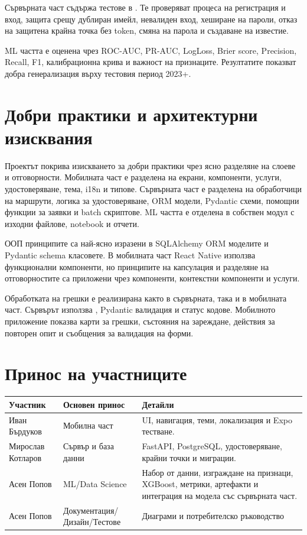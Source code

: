 \documentclass[12pt,a4paper]{article}
\newcommand{\code}[1]{\texttt{\detokenize{#1}}}
\begin{document}
Сървърната част съдържа тестове в \code{backend/tests/test_auth_api.py}. Те проверяват процеса на регистрация и вход, защита срещу дублиран имейл, невалиден вход, хеширане на пароли, отказ на защитена крайна точка без token, смяна на парола и създаване на известие.

ML частта е оценена чрез ROC-AUC, PR-AUC, LogLoss, Brier score, Precision, Recall, F1, калибрационна крива и важност на признаците. Резултатите показват добра генерализация върху тестовия период 2023+.

\section{Добри практики и архитектурни изисквания}

Проектът покрива изискването за добри практики чрез ясно разделяне на слоеве и отговорности. Мобилната част е разделена на екрани, компоненти, услуги, удостоверяване, тема, i18n и типове. Сървърната част е разделена на обработчици на маршрути, логика за удостоверяване, ORM модели, Pydantic схеми, помощни функции за заявки и batch скриптове. ML частта е отделена в собствен модул с изходни файлове, notebook и отчети.

ООП принципите са най-ясно изразени в SQLAlchemy ORM моделите и Pydantic schema класовете. В мобилната част React Native използва функционални компоненти, но принципите на капсулация и разделяне на отговорностите са приложени чрез компоненти, контекстни компоненти и услуги.

Обработката на грешки е реализирана както в сървърната, така и в мобилната част. Сървърът използва \code{HTTPException}, Pydantic валидация и статус кодове. Мобилното приложение показва карти за грешки, състояния на зареждане, действия за повторен опит и съобщения за валидация на форми.

\section{Принос на участниците}

\begin{longtable}{p{}p{}p{}}
\toprule
\textbf{Участник} & \textbf{Основен принос} & \textbf{Детайли} \\
\midrule
Иван Бърдуков & Мобилна част & UI, навигация, теми, локализация и Expo тестване. \\
Мирослав Котларов & Сървър и база данни & FastAPI, PostgreSQL, удостоверяване, крайни точки и миграции. \\
Асен Попов & ML/Data Science & Набор от данни, изграждане на признаци, XGBoost, метрики, артефакти и интеграция на модела със сървърната част. \\
Асен Попов & Документация/Дизайн/Тестове & Диаграми и потребителско ръководство \\
\bottomrule
\end{longtable}
\end{document}
